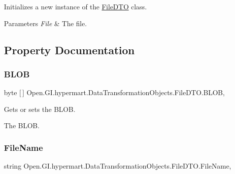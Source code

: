 Initializes a new instance of the \hyperlink{class_open_1_1_g_i_1_1hypermart_1_1_data_transformation_objects_1_1_file_d_t_o}{File\+D\+TO} class. 


\begin{DoxyParams}{Parameters}
{\em File} & The file.\\
\hline
\end{DoxyParams}


\subsection{Property Documentation}
\hypertarget{class_open_1_1_g_i_1_1hypermart_1_1_data_transformation_objects_1_1_file_d_t_o_af2ebb686a878cb8342e76648d048f19a}{}\label{class_open_1_1_g_i_1_1hypermart_1_1_data_transformation_objects_1_1_file_d_t_o_af2ebb686a878cb8342e76648d048f19a} 
\subsubsection{\texorpdfstring{B\+L\+OB}{BLOB}}
{\footnotesize\ttfamily byte \mbox{[}$\,$\mbox{]} Open.\+G\+I.\+hypermart.\+Data\+Transformation\+Objects.\+File\+D\+T\+O.\+B\+L\+OB\hspace{0.3cm}{\ttfamily [get]}, {\ttfamily [set]}}



Gets or sets the B\+L\+OB. 

The B\+L\+OB. \hypertarget{class_open_1_1_g_i_1_1hypermart_1_1_data_transformation_objects_1_1_file_d_t_o_a55fb34aacab9513037108ff3f1d287a8}{}\label{class_open_1_1_g_i_1_1hypermart_1_1_data_transformation_objects_1_1_file_d_t_o_a55fb34aacab9513037108ff3f1d287a8} 
\subsubsection{\texorpdfstring{File\+Name}{FileName}}
{\footnotesize\ttfamily string Open.\+G\+I.\+hypermart.\+Data\+Transformation\+Objects.\+File\+D\+T\+O.\+File\+Name\hspace{0.3cm}{\ttfamily [get]}, {\ttfamily [set]}}



